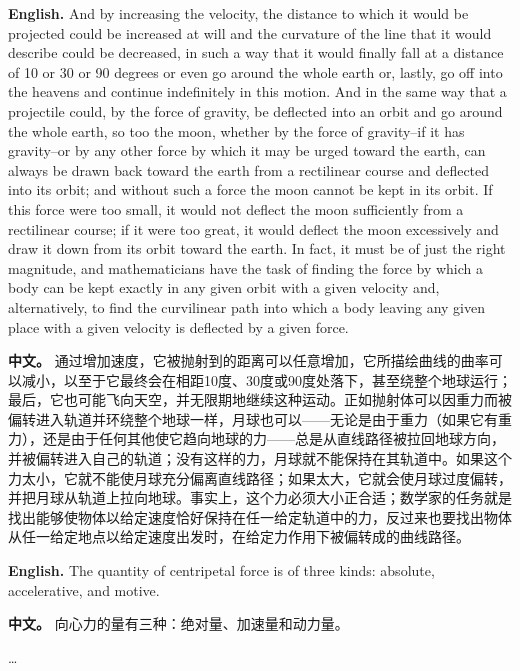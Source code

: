 \noindent\textbf{English.} And by increasing the velocity, the distance to which it would be projected could be increased at will and the curvature of the line that it would describe could be decreased, in such a way that it would finally fall at a distance of 10 or 30 or 90 degrees or even go around the whole earth or, lastly, go off into the heavens and continue indefinitely in this motion. And in the same way that a projectile could, by the force of gravity, be deflected into an orbit and go around the whole earth, so too the moon, whether by the force of gravity--if it has gravity--or by any other force by which it may be urged toward the earth, can always be drawn back toward the earth from a rectilinear course and deflected into its orbit; and without such a force the moon cannot be kept in its orbit. If this force were too small, it would not deflect the moon sufficiently from a rectilinear course; if it were too great, it would deflect the moon excessively and draw it down from its orbit toward the earth. In fact, it must be of just the right magnitude, and mathematicians have the task of finding the force by which a body can be kept exactly in any given orbit with a given velocity and, alternatively, to find the curvilinear path into which a body leaving any given place with a given velocity is deflected by a given force.
\par\noindent\textbf{中文。} 通过增加速度，它被抛射到的距离可以任意增加，它所描绘曲线的曲率可以减小，以至于它最终会在相距10度、30度或90度处落下，甚至绕整个地球运行；最后，它也可能飞向天空，并无限期地继续这种运动。正如抛射体可以因重力而被偏转进入轨道并环绕整个地球一样，月球也可以——无论是由于重力（如果它有重力），还是由于任何其他使它趋向地球的力——总是从直线路径被拉回地球方向，并被偏转进入自己的轨道；没有这样的力，月球就不能保持在其轨道中。如果这个力太小，它就不能使月球充分偏离直线路径；如果太大，它就会使月球过度偏转，并把月球从轨道上拉向地球。事实上，这个力必须大小正合适；数学家的任务就是找出能够使物体以给定速度恰好保持在任一给定轨道中的力，反过来也要找出物体从任一给定地点以给定速度出发时，在给定力作用下被偏转成的曲线路径。
\medskip

\noindent\textbf{English.} The quantity of centripetal force is of three kinds: absolute, accelerative, and motive.
\par\noindent\textbf{中文。} 向心力的量有三种：绝对量、加速量和动力量。
\medskip

\begin{center}
\ldots
\end{center}

